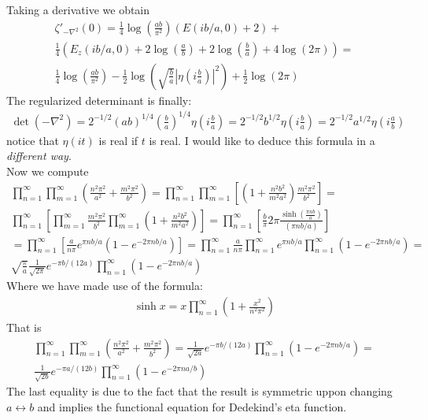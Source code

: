 \documentclass[12pt]{article}
\def\prodz{\prod}
\begin{document}
Taking a derivative we obtain
\begin{gather}
\zeta'_{-\nabla^2}(0)=\frac{1}{4}\log\left(\frac{ab}{\pi^2}\right)\left(E(ib/a,0)+2\right)+\nonumber\\
\frac{1}{4}\left(E_z(i b/a,0)+2\log\left(\frac{a}{b}\right)+2\log\left(\frac{b}{a}\right)+4\log(2\pi)\right)=\nonumber \\
\frac{1}{4}\log\left(\frac{ab}{\pi^2}\right)-\frac{1}{2}\log\left(\sqrt{\frac{b}{a}}\left|\eta\left(i\frac{b}{a}\right)\right|^2\right)+\frac{1}{2}\log(2\pi)
\end{gather}
The regularized determinant is finally:
\begin{gather}
\det (-\nabla^2)=2^{-1/2}(ab)^{1/4}\left(\frac{b}{a}\right)^{1/4}\eta\left(i\frac{b}{a}\right)=2^{-1/2}b^{1/2}\eta\left(i\frac{b}{a}\right)=2^{-1/2}a^{1/2}\eta\left(i\frac{a}{b}\right)
\end{gather}
notice that $\eta(it)$ is real if $t$ is real.
I would like to deduce this formula in a \textit{different way}.\\
Now we compute
\begin{gather}
\prodz_{n=1}^\infty\prodz_{m=1}^\infty\left(\frac{n^2\pi^2}{a^2}+\frac{m^2\pi^2}{b^2}\right)=
\prodz_{n=1}^\infty\prodz_{m=1}^\infty\left[\left(1+\frac{n^2 b^2}{m^2 a^2}\right)\frac{m^2\pi^2}{b^2}\right]= \nonumber\\
\prodz_{n=1}^\infty\left[\prodz_{m=1}^\infty\frac{m^2\pi^2}{b^2}\prodz_{m=1}^\infty\left(1+\frac{n^2 b^2}{m^2 a^2}\right)\right]= \prodz_{n=1}^\infty\left[\frac{b}{\pi}2\pi\frac{\sinh\left(\frac{\pi n b}{a}\right)}{(\pi n b/a)}\right]\nonumber \\
=\prodz_{n=1}^\infty\left[\frac{a}{n\pi}e^{\pi nb/a}\left(1-e^{-2\pi nb/a}\right)\right]=\prodz_{n=1}^\infty\frac{a}{n\pi}\prodz_{n=1}^\infty e^{\pi nb/a}\prodz_{n=1}^\infty \left(1-e^{-2\pi nb/a}\right)=\nonumber \\
\sqrt{\frac{\pi}{a}}\frac{1}{\sqrt{2\pi}}e^{-\pi b/(12 a)}\prodz_{n=1}^\infty \left(1-e^{-2\pi nb/a}\right)
\end{gather}
Where we have made use of the formula:
\begin{gather}
\sinh x=x\prod_{n=1}^\infty\left(1+\frac{x^2}{n^2\pi^2}\right)
\end{gather}
That is
\begin{gather}
\prodz_{n=1}^\infty\prodz_{m=1}^\infty\left(\frac{n^2\pi^2}{a^2}+\frac{m^2\pi^2}{b^2}\right)=\frac{1}{\sqrt{2a}}e^{-\pi b/(12 a)}\prodz_{n=1}^\infty \left(1-e^{-2\pi nb/a}\right)=\nonumber\\
\frac{1}{\sqrt{2b}}e^{-\pi a/(12 b)}\prodz_{n=1}^\infty \left(1-e^{-2\pi na/b}\right)
\end{gather}
The last equality is due to the fact that the result is symmetric uppon changing $a\leftrightarrow b$ and implies the functional equation for Dedekind's eta function.
\end{document}
